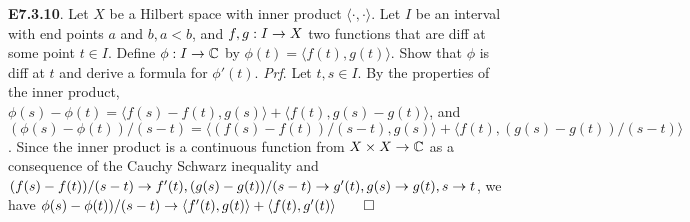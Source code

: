 {\bf E7.3.10}. Let $X$ be a Hilbert space with inner product $\langle \cdot, \cdot \rangle$. Let $I$ be an interval with end points $a$ and $b, a < b$, and $f, g: I \rightarrow X$ two functions that are diff at some point $t \in I$. Define $\phi: I \rightarrow \mathbb{C}$ by $\phi(t) = \langle f(t), g(t) \rangle$. Show that $\phi$ is diff at $t$ and derive a formula for $\phi'(t)$. {\it Prf}. Let $t, s \in I$.  By the properties of the inner product, $\phi(s) - \phi(t) = \langle f(s) - f(t), g(s) \rangle + \langle f(t), g(s) - g(t) \rangle$, and $(\phi(s) - \phi(t))/(s-t) = \langle (f(s) - f(t))/(s-t), g(s) \rangle + \langle f(t), (g(s) - g(t))/(s-t) \rangle$. Since the inner product is a continuous function from $X \times X \rightarrow \mathbb{C}$ as a consequence of the Cauchy Schwarz inequality and $(f(s) - f(t))/(s-t) \rightarrow f'(t), (g(s) - g(t))/(s-t) \rightarrow g'(t), g(s) \rightarrow g(t), s \rightarrow t$, we have $\phi(s) - \phi(t))/(s-t) \rightarrow  \langle f'(t), g(t) \rangle + \langle f(t), g'(t) \rangle \qed$